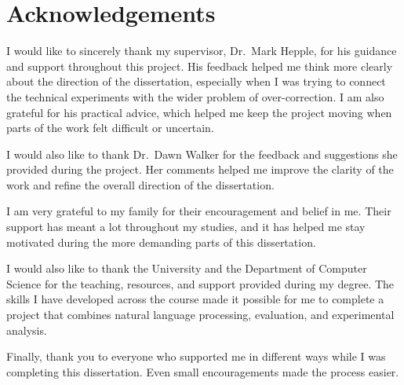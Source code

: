 \chapter*{\Large \center Acknowledgements}

I would like to sincerely thank my supervisor, Dr.~Mark Hepple, for his guidance and support throughout this project. His feedback helped me think more clearly about the direction of the dissertation, especially when I was trying to connect the technical experiments with the wider problem of over-correction. I am also grateful for his practical advice, which helped me keep the project moving when parts of the work felt difficult or uncertain.

I would also like to thank Dr.~Dawn Walker for the feedback and suggestions she provided during the project. Her comments helped me improve the clarity of the work and refine the overall direction of the dissertation.

I am very grateful to my family for their encouragement and belief in me. Their support has meant a lot throughout my studies, and it has helped me stay motivated during the more demanding parts of this dissertation.

I would also like to thank the University and the Department of Computer Science for the teaching, resources, and support provided during my degree. The skills I have developed across the course made it possible for me to complete a project that combines natural language processing, evaluation, and experimental analysis.

Finally, thank you to everyone who supported me in different ways while I was completing this dissertation. Even small encouragements made the process easier.
